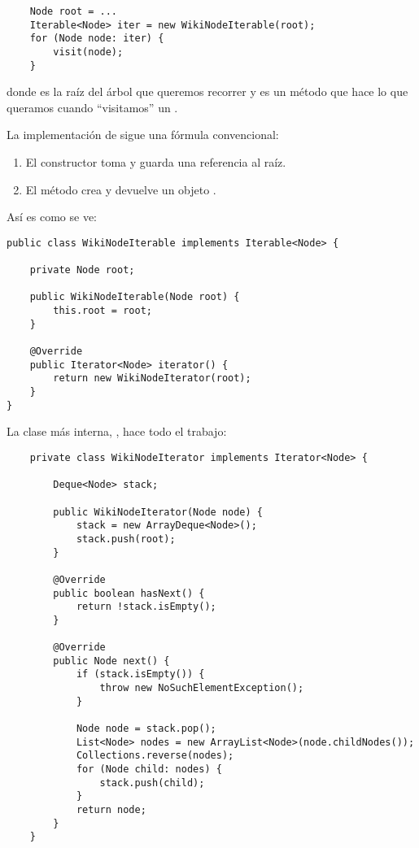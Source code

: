 \documentclass[12pt]{book}
\theoremstyle{exercise}
\begin{document}
\begin{verbatim}
    Node root = ...
    Iterable<Node> iter = new WikiNodeIterable(root);
    for (Node node: iter) {
        visit(node);
    }
\end{verbatim}

donde  es la raíz del árbol que queremos recorrer y
 es un método que hace lo que queramos cuando ``visitamos''
un .


La implementación de  sigue una fórmula
convencional:

\begin{enumerate}

\item
  El constructor toma y guarda una referencia al  raíz.

\item
  El método  crea y devuelve un objeto .

\end{enumerate}

Así es como se ve:

\begin{verbatim}
public class WikiNodeIterable implements Iterable<Node> {

    private Node root;

    public WikiNodeIterable(Node root) {
        this.root = root;
    }

    @Override
    public Iterator<Node> iterator() {
        return new WikiNodeIterator(root);
    }
}
\end{verbatim}

La clase más interna, , hace todo el trabajo:

\begin{verbatim}
    private class WikiNodeIterator implements Iterator<Node> {

        Deque<Node> stack;

        public WikiNodeIterator(Node node) {
            stack = new ArrayDeque<Node>();
            stack.push(root);
        }

        @Override
        public boolean hasNext() {
            return !stack.isEmpty();
        }

        @Override
        public Node next() {
            if (stack.isEmpty()) {
                throw new NoSuchElementException();
            }

            Node node = stack.pop();
            List<Node> nodes = new ArrayList<Node>(node.childNodes());
            Collections.reverse(nodes);
            for (Node child: nodes) {
                stack.push(child);
            }
            return node;
        }
    }
\end{verbatim}
\end{document}
